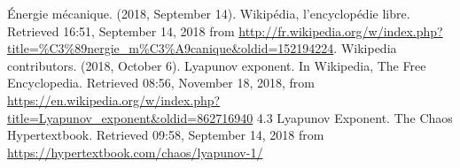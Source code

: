 \documentclass[a4paper,12pt,twoside]{article}
\begin{document}
\begin{thebibliography}{99}
	 Énergie mécanique. (2018, September 14). Wikipédia, l'encyclopédie libre. Retrieved 16:51, September 14, 2018 from \url{http://fr.wikipedia.org/w/index.php?title=%C3%89nergie_m%C3%A9canique&oldid=152194224}.
	 Wikipedia contributors. (2018, October 6). Lyapunov exponent. In Wikipedia, The Free Encyclopedia. Retrieved 08:56, November 18, 2018, from \url{https://en.wikipedia.org/w/index.php?title=Lyapunov_exponent&oldid=862716940}
	 4.3 Lyapunov Exponent. The Chaos Hypertextbook. Retrieved 09:58, September 14, 2018 from \url{https://hypertextbook.com/chaos/lyapunov-1/}

\end{thebibliography}
\end{document}
